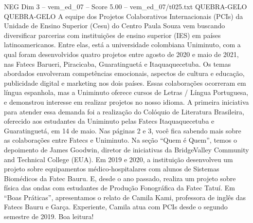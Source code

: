 \begin{textsample}{NEG Dim 3 – vem\_ed\_07 – Score 5.00 – vem\_ed\_07/t025.txt}  \label{ex:f3_neg_107}
QUEBRA-GELO QUEBRA-GELO A equipe dos Projetos Colaborativos Internacionais (PCIs) da Unidade de Ensino Superior (Cesu) do Centro Paula Souza vem buscando diversificar parcerias com instituições de ensino superior (IES) em países latinoamericanos.
Entre elas, está a universidade colombiana Uniminuto, com a qual foram desenvolvidos quatro projetos entre agosto de 2020 e maio de 2021, nas Fatecs Barueri, Piracicaba, Guaratinguetá e Itaquaquecetuba.
Os temas abordados envolveram competências emocionais, aspectos de cultura e educação, publicidade digital e marketing nos dois países.
Essas colaborações ocorreram em língua espanhola, mas a Uniminuto oferece cursos de Letras / Língua Portuguesa, e demonstrou interesse em realizar projetos no nosso idioma.
A primeira iniciativa para atender essa demanda foi a realização do Colóquio de Literatura Brasileira, oferecido aos estudantes da Uniminuto pelas Fatecs Itaquaquecetuba e Guaratinguetá, em 14 de maio.
Nas páginas 2 e 3, você fica sabendo mais sobre as colaborações entre Fatecs e Uniminuto.
Na seção “Quem é Quem”, temos o depoimento de James Goodwin, diretor de iniciativas da BridgeValley Community and Technical College (EUA).
Em 2019 e 2020, a instituição desenvolveu um projeto sobre equipamentos médico-hospitalares com alunos de Sistemas Biomédicos da Fatec Bauru.
E, desde o ano passado, realiza um projeto sobre física das ondas com estudantes de Produção Fonográfica da Fatec Tatuí.
Em “Boas Práticas”, apresentamos o relato de Camila Kami, professora de inglês das Fatecs Bauru e Garça.
Experiente, Camila atua com PCIs desde o segundo semestre de 2019.
Boa leitura!

\end{textsample}
